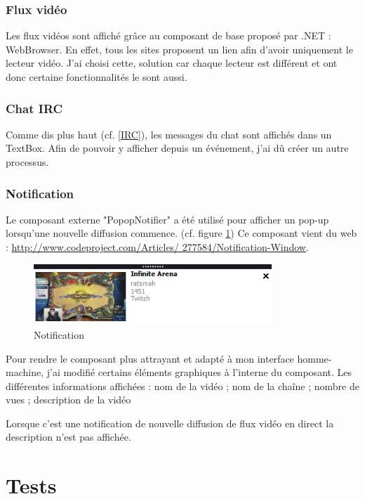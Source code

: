 \documentclass[11pt]{report} %
\begin{document}
		\subsection{Flux vidéo}
		Les flux vidéos sont affiché grâce au composant de base proposé par .NET : WebBrowser. En effet, tous les sites proposent un lien afin d'avoir uniquement le lecteur vidéo.
		J'ai choisi cette, solution car chaque lecteur est différent et ont donc certaine fonctionnalités le sont aussi.
		
		\subsection{Chat IRC}
		Comme dis plus haut (cf. \ref{IRC}), les messages du chat sont affichés dans un TextBox. Afin de pouvoir y afficher depuis un événement, j'ai dû créer un autre processus.
		
		
		\subsection{Notification}
		Le composant externe "PopopNotifier" a été utilisé pour afficher un pop-up lorsqu’une nouvelle
		diffusion commence. (cf. figure \ref{vue notification})  Ce composant vient du web : \url{http://www.codeproject.com/Articles/
		277584/Notification-Window}.
		
		\begin{figure}[h]
			\center
			\includegraphics[width=0.8\textwidth]{../img/notificationview.png}
			\caption{Notification}
			\label{vue notification}
		\end{figure}
		
		Pour rendre le composant plus attrayant et adapté à mon interface homme-machine, j’ai modifié
		certains éléments graphiques à l'interne du composant.
		Les différentes informations affichées : nom de la vidéo ; nom de la chaîne ; nombre de vues ; description de la vidéo
		
		Lorsque c'est une notification de nouvelle diffusion de flux vidéo en direct la description n'est pas affichée.
		
	
\chapter{Tests}
\end{document}

